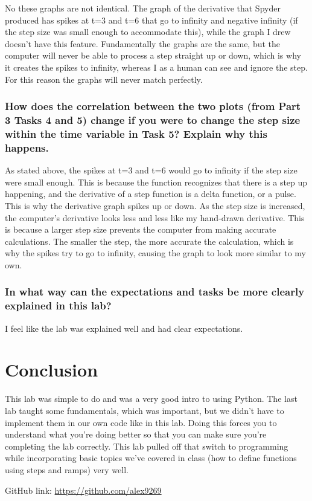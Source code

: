 \documentclass[12pt]{report}
\begin{document}
 No these graphs are not identical. The graph of the derivative that Spyder produced has spikes at t=3 and t=6 that go to infinity and negative infinity (if the step size was small enough to accommodate this), while the graph I drew doesn't have this feature. Fundamentally the graphs are the same, but the computer will never be able to process a step straight up or down, which is why it creates the spikes to infinity, whereas I as a human can see and ignore the step. For this reason the graphs will never match perfectly.
 
 \subsubsection{How does the correlation between the two plots (from Part 3 Tasks 4 and 5) change if you were to change the step size within the time variable in Task 5? Explain why this happens.}
 
 As stated above, the spikes at t=3 and t=6 would go to infinity if the step size were small enough. This is because the function recognizes that there is a step up happening, and the derivative of a step function is a delta function, or a pulse. This is why the derivative graph spikes up or down. As the step size is increased, the computer's derivative looks less and less like my hand-drawn derivative. This is because a larger step size prevents the computer from making accurate calculations. The smaller the step, the more accurate the calculation, which is why the spikes try to go to infinity, causing the graph to look more similar to my own.
 
 \subsubsection{In what way can the expectations and tasks be more clearly explained in this lab?}
 
 I feel like the lab was explained well and had clear expectations. 
 
 \newpage
 \section{Conclusion}
 
 This lab was simple to do and was a very good intro to using Python. The last lab taught some fundamentals, which was important, but we didn't have to implement them in our own code like in this lab. Doing this forces you to understand what you're doing better so that you can make sure you're completing the lab correctly. This lab pulled off that switch to programming while incorporating basic topics we've covered in class (how to define functions using steps and ramps) very well. 
 
 GitHub link: \url{https://github.com/alex9269}
 
\end{document}
